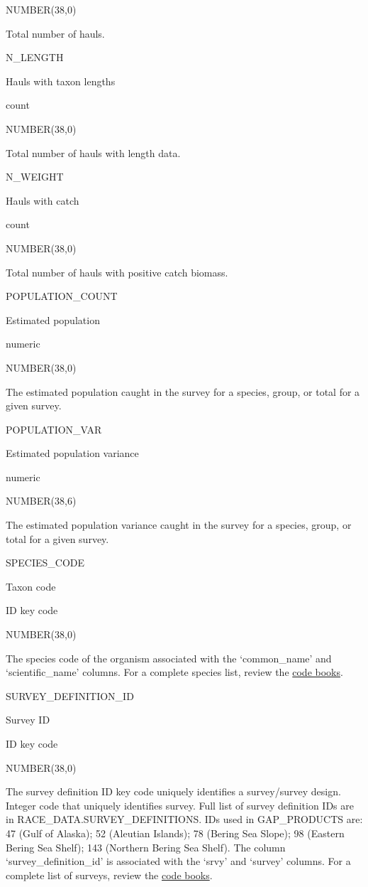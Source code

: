 \documentclass[
  letterpaper,
  oneside,
  open=any]{scrbook}
\begin{document}
NUMBER(38,0)

Total number of hauls.

N\_LENGTH

Hauls with taxon lengths

count

NUMBER(38,0)

Total number of hauls with length data.

N\_WEIGHT

Hauls with catch

count

NUMBER(38,0)

Total number of hauls with positive catch biomass.

POPULATION\_COUNT

Estimated population

numeric

NUMBER(38,0)

The estimated population caught in the survey for a species, group, or
total for a given survey.

POPULATION\_VAR

Estimated population variance

numeric

NUMBER(38,6)

The estimated population variance caught in the survey for a species,
group, or total for a given survey.

SPECIES\_CODE

Taxon code

ID key code

NUMBER(38,0)

The species code of the organism associated with the `common\_name' and
`scientific\_name' columns. For a complete species list, review the
\href{https://www.fisheries.noaa.gov/resource/document/groundfish-survey-species-code-manual-and-data-codes-manual}{code
books}.

SURVEY\_DEFINITION\_ID

Survey ID

ID key code

NUMBER(38,0)

The survey definition ID key code uniquely identifies a survey/survey
design. Integer code that uniquely identifies survey. Full list of
survey definition IDs are in RACE\_DATA.SURVEY\_DEFINITIONS. IDs used in
GAP\_PRODUCTS are: 47 (Gulf of Alaska); 52 (Aleutian Islands); 78
(Bering Sea Slope); 98 (Eastern Bering Sea Shelf); 143 (Northern Bering
Sea Shelf). The column `survey\_definition\_id' is associated with the
`srvy' and `survey' columns. For a complete list of surveys, review the
\href{https://www.fisheries.noaa.gov/resource/document/groundfish-survey-species-code-manual-and-data-codes-manual}{code
books}.
\end{document}
